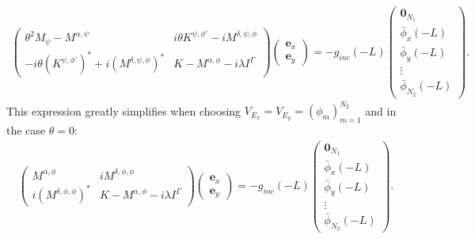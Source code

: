 \begin{align*}
\left(\begin{matrix}
\theta^2 M_{\psi}-M^{\alpha,\psi} & i\theta K^{\psi,\phi'}-i M^{\delta,\psi,\phi} \\
-i\theta (K^{\psi,\phi'})^{*}+i (M^{\delta,\psi,\phi})^{*} & K-M^{\alpha,\phi}-i\lambda I^{\Gamma}
\end{matrix}\right)
\left(
\begin{matrix}
\boldsymbol{e}_x\\
\boldsymbol{e}_y
\end{matrix}
\right)=-g_{inc}(-L)
\left(
\begin{matrix}
\boldsymbol{0}_{N_{1}}\\
\bar{\phi}_{x}(-L)\\
\bar{\phi}_{y}(-L)\\
\vdots\\
\bar{\phi}_{N_{2}}(-L)
\end{matrix}
\right).
\end{align*}
This expression greatly simplifies when choosing $V_{E_x}=V_{E_{y}}=\left(\phi_{m}\right)_{m=1}^{N_{2}}$ and in the case $\theta=0$:
\begin{align}
\label{eq:simple_system}
\left(\begin{matrix}
M^{\alpha,\phi} & i M^{\delta,\phi,\phi} \\
i (M^{\delta,\phi,\phi})^{*} & K-M^{\alpha,\phi}-i\lambda I^{\Gamma}
\end{matrix}\right)
\left(
\begin{matrix}
\boldsymbol{e}_x\\ 
\boldsymbol{e}_y
\end{matrix}
\right)=-g_{inc}(-L)
\left(
\begin{matrix}
\boldsymbol{0}_{N_{1}}\\
\bar{\phi}_{x}(-L)\\
\bar{\phi}_{y}(-L)\\
\vdots\\
\bar{\phi}_{N_{2}}(-L)
\end{matrix}
\right).
\end{align}
